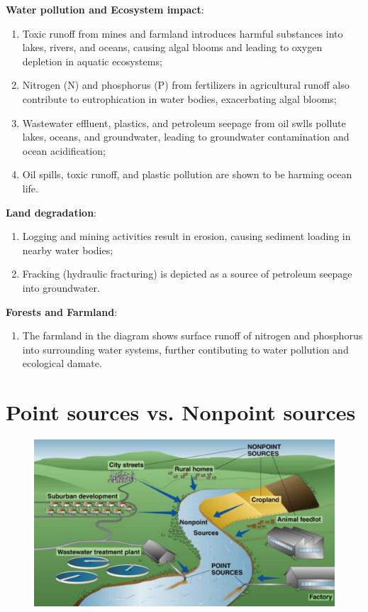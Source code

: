 \documentclass{article}
\newcommand{\cfig}[1]{%
  \begin{figure}[ht!]%
    \centering%
    #1%
  \end{figure}%
}
\begin{document}
\textbf{Water pollution and Ecosystem impact}:
\begin{enumerate}
    \item Toxic runoff from mines and farmland introduces harmful substances into lakes,
        rivers, and oceans, causing algal blooms and leading to oxygen depletion
        in aquatic ecosystems;
    \item Nitrogen (N) and phosphorus (P) from fertilizers in agricultural runoff also
        contribute to eutrophication in water bodies, exacerbating algal blooms;
    \item Wastewater effluent, plastics, and petroleum seepage from oil swlls pollute lakes,
        oceans, and groundwater, leading to groundwater contamination and ocean acidification;
    \item Oil spills, toxic runoff, and plastic pollution are shown to be harming ocean life.
\end{enumerate}

\textbf{Land degradation}:
\begin{enumerate}
    \item Logging and mining activities result in erosion, causing sediment loading in nearby water bodies;
    \item Fracking (hydraulic fracturing) is depicted as a source of petroleum seepage into groundwater.
\end{enumerate}

\textbf{Forests and Farmland}:
\begin{enumerate}
    \item The farmland in the diagram shows surface runoff of nitrogen and phosphorus
        into surrounding water systems, further contibuting to water pollution
        and ecological damate.
\end{enumerate}

\section{Point sources vs. Nonpoint sources}
\vspace*{.3cm}
\cfig{\includegraphics*[width=.8\textwidth]{media/Point-and-nonpoint.png}}
\vspace*{.2cm}
\end{document}
